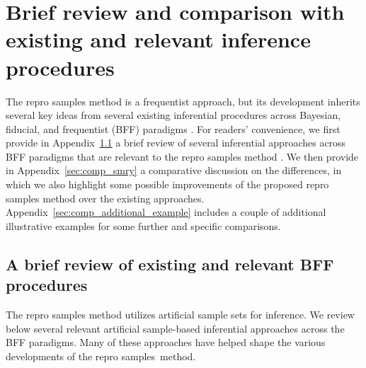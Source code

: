 \documentclass[12pt]{article}
\theoremstyle{shortspace}
\begin{document}
\section{Brief review and comparison with existing and relevant inference procedures}\label{sec:BFFcomprison}

The repro samples method is a frequentist approach, but
its development inherits several key ideas from several 
existing inferential procedures
across Bayesian, fiducial, and frequentist (BFF) paradigms \citep{Berger2020}.  
For readers' convenience, we first provide in Appendix~\ref{sec:comp_review} a brief review of several  inferential approaches across BFF paradigms that are relevant to the repro samples method . We then provide in Appendix~\ref{sec:comp_smry} a comparative discussion on  the differences, in which we  also highlight some possible improvements of the proposed repro samples method over the existing approaches. 
Appendix~\ref{sec:comp_additional_example} includes a couple of additional  illustrative examples for some further and specific comparisons. 


\subsection{A brief review of existing and 
relevant BFF procedures}\label{sec:comp_review}




The repro samples method  utilizes artificial sample sets for inference. 
We review below several relevant artificial sample-based inferential approaches across the BFF paradigms. Many of these approaches have helped shape the various developments of the repro samples~method. 
\end{document}
